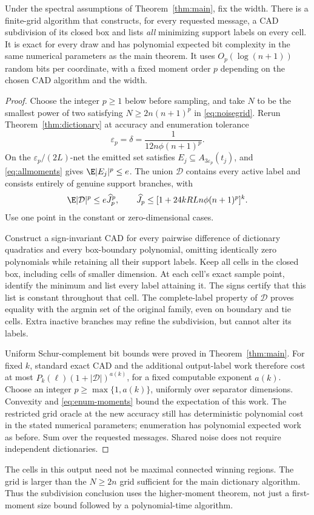 \begin{corollary}\label{cor:subdivision}
Under the spectral assumptions of Theorem~\ref{thm:main}, fix the width.
There is a finite-grid algorithm that constructs, for every requested message,
a CAD subdivision of its closed box and lists \emph{all} minimizing support
labels on every cell. It is exact for every draw and has polynomial expected
bit complexity in the same numerical parameters as the main theorem.
It uses $O_p(\log(n+1))$ random bits per coordinate, with a fixed moment
order $p$ depending on the chosen CAD algorithm and the width.
\end{corollary}
\begin{proof}
Choose the integer $p\ge1$ below before sampling, and take $N$ to be the
smallest power of two satisfying $N\ge2n(n+1)^p$ in
\eqref{eq:noisegrid}. Rerun
Theorem~\ref{thm:dictionary} at accuracy and enumeration tolerance
\[
 \varepsilon_p=\delta=\frac1{12n\phi(n+1)^p}.
\]
On the $\varepsilon_p/(2L)$-net the emitted set satisfies
$E_j\subseteq A_{3\varepsilon_p}(t_j)$, and
\eqref{eq:allmoments} gives $\E|E_j|^p\le e$. The union $\mathcal D$
contains every active label and consists entirely of genuine support
branches, with
\begin{equation}\label{eq:enum-moments}
 \E|\mathcal D|^p\le e\widehat J_p^p,\qquad
 \widehat J_p\le[1+24kRLn\phi(n+1)^p]^k.
\end{equation}
Use one point in the constant or zero-dimensional cases.

Construct a sign-invariant CAD for every pairwise difference of dictionary
quadratics and every box-boundary polynomial, omitting identically zero
polynomials while retaining all their support labels. Keep all cells in
the closed box, including cells of smaller dimension. At each cell's exact
sample point, identify the minimum and list every label attaining it.
The signs certify that this list is constant throughout that cell.
The complete-label property of $\mathcal D$ proves equality with the argmin
set of the original family, even on boundary and tie cells. Extra inactive
branches may refine the subdivision, but cannot alter its labels.

Uniform Schur-complement bit bounds were proved in Theorem~\ref{thm:main}.
For fixed $k$, standard exact CAD and the additional output-label work
therefore cost at most $P_k(\ell)(1+|\mathcal D|)^{a(k)}$, for a fixed
computable exponent $a(k)$. Choose an integer $p\ge\max\{1,a(k)\}$,
uniformly over separator dimensions. Convexity and \eqref{eq:enum-moments}
bound the expectation of this work. The restricted grid oracle at the new
accuracy still has deterministic polynomial cost in the stated numerical
parameters; enumeration has polynomial expected work as before. Sum over
the requested messages. Shared noise does not require independent dictionaries.
\end{proof}

The cells in this output need not be maximal connected winning regions.
The grid is larger than the $N\ge2n$ grid sufficient for the main dictionary
algorithm. Thus the subdivision conclusion uses the higher-moment theorem,
not just a first-moment size bound followed by a polynomial-time algorithm.
